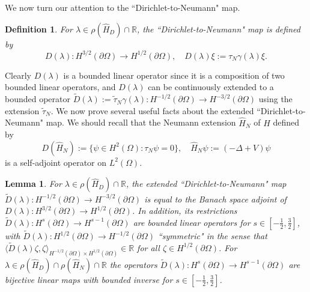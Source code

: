 \documentclass{article}
\numberwithin{equation}{section}
\newtheorem{lemma}{Lemma}[section]
\newtheorem{definition}{Definition}[section]
\begin{document}
    We now turn our attention to the ``Dirichlet-to-Neumann" map. \begin{definition}\label{Dichlet to Neumann}
 For $\lambda \in \rho(\hat{H}_D)\cap \mathbb{R}$, the ``Dirichlet-to-Neumann" map is defined by
    \begin{equation}\label{Dirichlet to Neumann Eq again}
        D(\lambda):H^{3/2}(\partial \Omega)\to H^{1/2}(\partial \Omega), \quad D(\lambda)\xi:=\tau_N \gamma(\lambda)\xi.
    \end{equation}
\end{definition}
Clearly $D(\lambda)$ is a bounded linear operator since it is a composition of two bounded linear operators, and $D(\lambda)$ can be continuously extended to a bounded operator $\tilde{D}(\lambda):=\tilde{\tau}_N\gamma(\lambda):H^{-1/2}(\partial \Omega)\to H^{-3/2}(\partial \Omega)$ using the extension $\tilde{\tau}_N$. We now prove several useful facts about the extended ``Dirichlet-to-Neumann" map. We should recall that the Neumann extension $\hat{H}_N$ of $\hat{H}$ defined by 
\begin{equation}
    D(\hat{H}_N):=\{ \psi \in H^2(\Omega): \tau_N \psi=0\}, \quad \hat{H}_N\psi:=(-\Delta +V)\psi
\end{equation}
is a self-adjoint operator on $L^2(\Omega)$.
\begin{lemma}\label{Dirichlet to Neumann Facts}
    For $\lambda \in \rho(\hat{H}_D)\cap \mathbb{R}$, the extended ``Dirichlet-to-Neumann" map $\tilde{D}(\lambda):H^{-1/2}(\partial \Omega)\to H^{-3/2}(\partial \Omega)$ is equal to the Banach space adjoint of $D(\lambda):H^{3/2}(\partial \Omega)\to H^{1/2}(\partial \Omega)$. In addition, its restrictions $\tilde{D}(\lambda):H^s(\partial \Omega)\to H^{s-1}(\partial \Omega)$ are bounded linear operators for $s \in [-\frac{1}{2},\frac{3}{2}]$, with $\tilde{D}(\lambda):H^{1/2}(\partial \Omega)\to H^{-1/2}(\partial \Omega) $ ``symmetric" in the sense that $\langle \tilde{D}(\lambda)\zeta,\zeta \rangle_{H^{-1/2}(\partial \Omega)\times H^{1/2}(\partial \Omega)}\in \mathbb{R}$ for all $\zeta \in H^{1/2}(\partial \Omega)$. For $\lambda \in \rho(\hat{H}_D)\cap \rho(\hat{H}_N)\cap \mathbb{R}$ the operators $\tilde{D}(\lambda):H^s(\partial \Omega)\to H^{s-1}(\partial \Omega)$ are bijective linear maps with bounded inverse for $s \in [-\frac{1}{2},\frac{3}{2}]$. 
\end{lemma}
\end{document}
